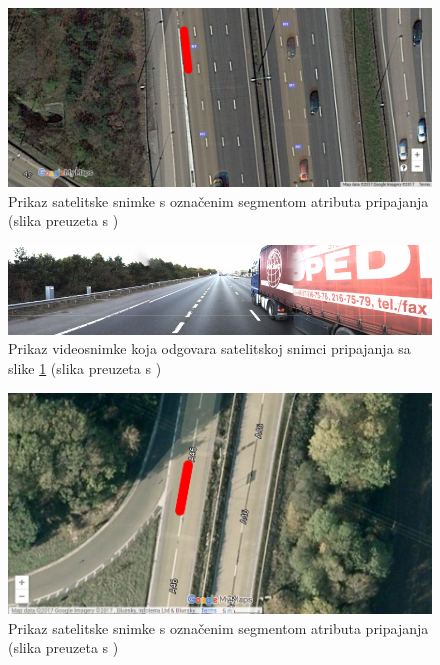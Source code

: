 \documentclass[times, utf8, diplomski, numeric]{fer}
\begin{document}
\begin{figure}[H]
\centering
\includegraphics[scale=0.35]{images/sattelite_merge_lane_irap.png}
\caption{Prikaz satelitske snimke s označenim segmentom atributa pripajanja (slika preuzeta s \citep{url:google_maps})}
\label{img:sattelite_merge_lane_irap}
\end{figure}

\begin{figure}[H]
\centering
\includegraphics[scale=0.5]{images/video_merge_lane_irap.png}
\caption{Prikaz videosnimke koja odgovara satelitskoj snimci pripajanja sa slike \ref{img:sattelite_merge_lane_irap} (slika preuzeta s \citep{url:ftts_irap})}
\label{img:video_merge_lane_irap}
\end{figure}

\begin{figure}[H]
\centering
\includegraphics[scale=0.35]{images/sattelite_merge_lane_irap2.png}
\caption{Prikaz satelitske snimke s označenim segmentom atributa pripajanja (slika preuzeta s \citep{url:google_maps})}
\label{img:sattelite_merge_lane_irap2}
\end{figure}
\end{document}
